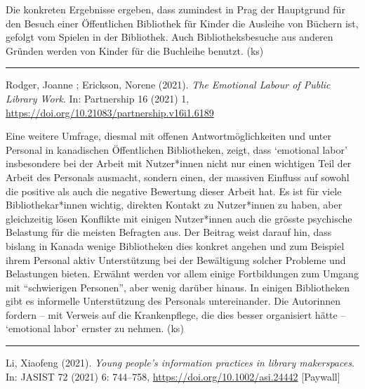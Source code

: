 \documentclass[a4paper,
fontsize=11pt,
oneside,
numbers=noperiodatend,
parskip=half-,
bibliography=totoc,
final
]{scrartcl}
\begin{document}
Die konkreten Ergebnisse ergeben, dass zumindest in Prag der Hauptgrund
für den Besuch einer Öffentlichen Bibliothek für Kinder die Ausleihe von
Büchern ist, gefolgt vom Spielen in der Bibliothek. Auch
Bibliotheksbesuche aus anderen Gründen werden von Kinder für die
Buchleihe benutzt. (ks)

\begin{center}\rule{0.5\linewidth}{0.5pt}\end{center}

Rodger, Joanne ; Erickson, Norene (2021). \emph{The Emotional Labour of
Public Library Work}. In: Partnership 16 (2021) 1,
\url{https://doi.org/10.21083/partnership.v16i1.6189}

Eine weitere Umfrage, diesmal mit offenen Antwortmöglichkeiten und unter
Personal in kanadischen Öffentlichen Bibliotheken, zeigt, dass
\enquote*{emotional labor} insbesondere bei der Arbeit mit Nutzer*innen
nicht nur einen wichtigen Teil der Arbeit des Personals ausmacht,
sondern einen, der massiven Einfluss auf sowohl die positive als auch
die negative Bewertung dieser Arbeit hat. Es ist für viele
Bibliothekar*innen wichtig, direkten Kontakt zu Nutzer*innen zu haben,
aber gleichzeitig lösen Konflikte mit einigen Nutzer*innen auch die
grösste psychische Belastung für die meisten Befragten aus. Der Beitrag
weist darauf hin, dass bislang in Kanada wenige Bibliotheken dies
konkret angehen und zum Beispiel ihrem Personal aktiv Unterstützung bei
der Bewältigung solcher Probleme und Belastungen bieten. Erwähnt werden
vor allem einige Fortbildungen zum Umgang mit \enquote{schwierigen
Personen}, aber wenig darüber hinaus. In einigen Bibliotheken gibt es
informelle Unterstützung des Personals untereinander. Die Autorinnen
fordern -- mit Verweis auf die Krankenpflege, die dies besser
organisiert hätte -- \enquote*{emotional labor} ernster zu nehmen. (ks)

\begin{center}\rule{0.5\linewidth}{0.5pt}\end{center}

Li, Xiaofeng (2021). \emph{Young people's information practices in
library makerspaces}. In: JASIST 72 (2021) 6: 744--758,
\url{https://doi.org/10.1002/asi.24442} {[}Paywall{]}
\end{document}
